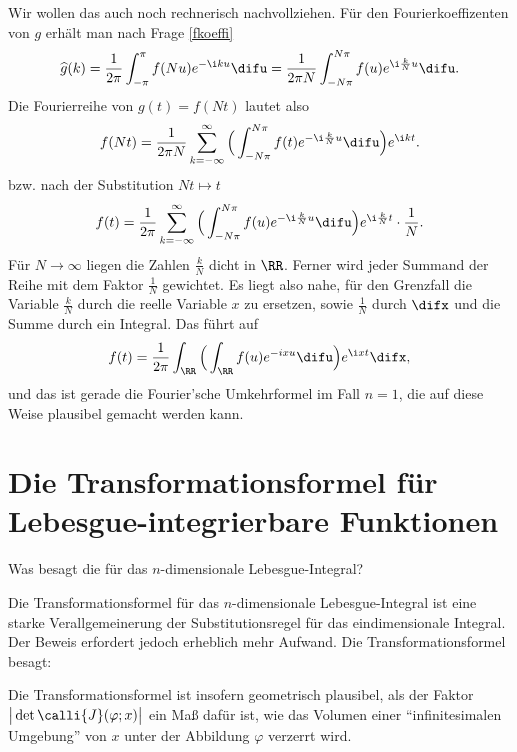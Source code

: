\begin{antwort}
  Wir wollen das auch noch rechnerisch nachvollziehen. 
  Für den Fourierkoeffizenten von $g$ erhält man nach Frage 
  \ref{fkoeffi}
  \[
  \widehat{g}( k ) = 
  \frac{1}{2\pi} \int_{-\pi}^\pi f(N u) e^{-\i k u}\difu=
  \frac{1}{2\pi N} \int_{-N \pi}^{N\pi} f(u) e^{\i \frac{k}{N} u} \difu.
  \]
  Die Fourierreihe von $g(t)=f(N t)$ lautet also 
  \[
  f(N t) = \frac{1}{2\pi N}\sum_{k=-\infty}^\infty 
  \Big( \int_{-N\pi}^{N\pi} 
  f(t) e^{-\i \frac{k}{N} u}\difu \Big)  e^{\i k t }.
  \]
  bzw. nach der Substitution $Nt \mapsto t$
  \[
  f(t) = \frac{1}{2\pi}\sum_{k=-\infty}^\infty 
  \Big( \int_{-N\pi}^{N\pi} 
  f(u) e^{- \i \frac{k}{N} u}\difu \Big)  e^{\i \frac{k}{N} t } \cdot 
  \frac{1}{N}.
  \]
  Für $N\to\infty$ liegen die Zahlen $\frac{k}{N}$ dicht in $\RR$. 
  Ferner wird jeder Summand der Reihe mit dem Faktor $\frac{1}{N}$ 
  gewichtet. Es liegt also nahe, für den 
  Grenzfall die Variable $\frac{k}{N}$ durch 
  die reelle Variable $x$ zu ersetzen, sowie $\frac{1}{N}$ durch $\difx$ 
  und die Summe durch ein Integral. Das führt auf 
  \[
  f(t) = \frac{1}{2\pi} \int_\RR \Big( \int_\RR f(u) e^{-i x u} \difu \Big) 
  e^{\i x t } \difx,
  \]
  und das ist gerade die Fourier'sche Umkehrformel im Fall $n=1$, 
  die auf diese Weise plausibel gemacht werden kann.
  \AntEnd  
\end{antwort}

\section{Die Transformationsformel f\"ur Lebesgue-integrierbare 
  Funktionen}

\begin{frage}\label{11_transformationsformel}
  Was besagt die  f\"ur das 
  $n$-dimensionale Lebesgue-Integral?
\end{frage}

\begin{antwort}
  Die Transformationsformel f\"ur das $n$-dimensionale 
  Lebesgue-Integral ist eine starke Verallgemeinerung 
  der Substitutionsregel f\"ur das eindimensionale Integral. Der 
  Beweis erfordert jedoch erheblich mehr Aufwand. 
  Die Transformationsformel besagt:

  \medskip
  \noindent{}%
  \noindent
  Die Transformationsformel ist insofern geometrisch plausibel, 
  als der Faktor $\big|\det\calli{J}(\varphi;x)\big|$ ein Maß dafür ist, 
  wie das Volumen einer "`infinitesimalen Umgebung"' von $x$ unter der 
  Abbildung $\varphi$ verzerrt wird. \AntEnd  
\end{antwort}


